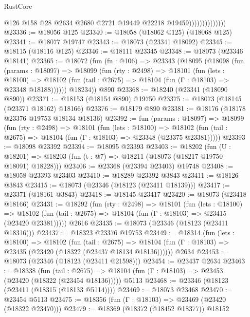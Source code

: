 \begin{lexlean}{RustCore}
\begin{coremodule}
                                @126
                                @158
                                @28
                                @2634
                                @2680
                                @2721
                                @19449
                                @22218
                                @19459))))))))))))))
@23336 := @18056 @125
@23340 := @18058 (@18062 @125) (@18068 @125)
@23341 := @18077 @19747
@23343 := @18073 (@23341 @18092)
@23345 := @18115 (@18116 @125)
@23346 := @18111 @23345
@23348 := @18073 (@23346 @18141)
@23365 := @18072
    (fun (fn : @106) =>
    @23343
      (@18095
        (@18098
          (fun (params : @18097) =>
          @18099
            (fun (rty : @2498) =>
            @18101
              (fun (lets : @18100) =>
              @18102 (fun (tail : @2675) => @18104 (fun (Γ : @18103) => @23348 @18188))))))
        @18234))
    @890
@23368 := @18240 (@23341 (@18090 @890))
@23371 := @18153 (@18154 @890) @19750
@23375 := @18073 (@18145 (@23371 @18162) @18166)
@23376 := @18179 @890
@23381 := @18176 (@18178 @23376 @19753 @18134 @18136)
@23392 := fun (params : @18097) =>
  @18099
    (fun (rty : @2498) =>
    @18101
      (fun (lets : @18100) =>
      @18102 (fun (tail : @2675) => @18104 (fun (Γ : @18103) => @23348 (@23375 @23381)))))
@23393 := @18098 @23392
@23394 := @18095 @23393
@23403 := @18202
    (fun (U : @18201) => @18203 (fun (t : @7) => @18211 (@18073 (@18217 @19750 @18091) @18228)))
@23406 := @23368 (@23394 @23403) @19748
@23408 := @18058 @23393 @23403
@23410 := @18289 @23392 @3843
@23411 := @18126 @3843
@23415 := @18073 (@23346 (@18123 (@23411 @18139)))
@23417 := @23371 (@18161 @3843)
@23418 := @18145 @23417
@23420 := @18073 (@23418 @18166)
@23431 := @18292
    (fun (rty : @2498) =>
    @18101
      (fun (lets : @18100) =>
      @18102 (fun (tail : @2675) => @18104 (fun (Γ : @18103) => @23415 (@23420 @23381)))))
    @2616
@23435 := @18073 (@23346 (@18123 (@23411 @18316)))
@23437 := @18323 @23376 @19753
@23449 := @18314
    (fun (lets : @18100) =>
    @18102
      (fun (tail : @2675) =>
      @18104 (fun (Γ : @18103) => @23435 (@23420 (@18322 (@23437 @18134 @18136))))))
    @2634
@23453 := @18073 (@23346 (@18123 (@23411 @21598)))
@23454 := @23437 @2634
@23463 := @18338
    (fun (tail : @2675) => @18104 (fun (Γ : @18103) => @23453 (@23420 (@18322 (@23454 @18136)))))
    @5113
@23468 := @23346 (@18123 (@23411 (@18315 (@18133 @5114))))
@23469 := @18073 @23468
@23470 := @23454 @5113
@23475 := @18356 (fun (Γ : @18103) => @23469 (@23420 (@18322 @23470)))
@23479 := @18369 (@18372 (@18452 @18377)) @18152

\end{coremodule}
\end{lexlean}

